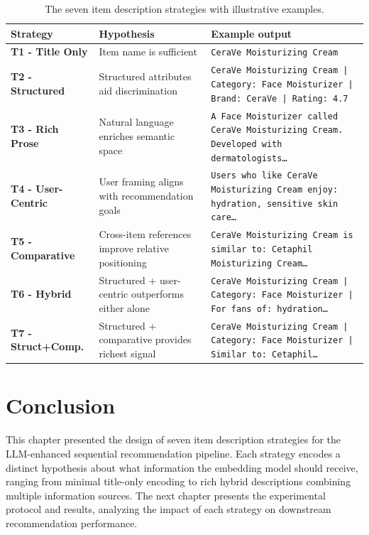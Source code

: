 \documentclass[12pt,a4paper]{report}
\begin{document}
\begin{table}[h]
\centering
\caption{The seven item description strategies with illustrative examples.}
\label{tab:prompt_strategies}
\begin{tabular}{p{2.2cm} p{3.5cm} p{7.0cm}}
\toprule
\textbf{Strategy} & \textbf{Hypothesis} & \textbf{Example output} \\
\midrule
\textbf{T1 - Title Only} & Item name is sufficient &
  \texttt{CeraVe Moisturizing Cream} \\
\midrule
\textbf{T2 - Structured} & Structured attributes aid discrimination &
  \texttt{CeraVe Moisturizing Cream | Category: Face Moisturizer | Brand: CeraVe | Rating: 4.7} \\
\midrule
\textbf{T3 - Rich Prose} & Natural language enriches semantic space &
  \texttt{A Face Moisturizer called CeraVe Moisturizing Cream. Developed with dermatologists\ldots} \\
\midrule
\textbf{T4 - User-Centric} & User framing aligns with recommendation goals &
  \texttt{Users who like CeraVe Moisturizing Cream enjoy: hydration, sensitive skin care\ldots} \\
\midrule
\textbf{T5 - Comparative} & Cross-item references improve relative positioning &
  \texttt{CeraVe Moisturizing Cream is similar to: Cetaphil Moisturizing Cream\ldots} \\
\midrule
\textbf{T6 - Hybrid} & Structured + user-centric outperforms either alone &
  \texttt{CeraVe Moisturizing Cream | Category: Face Moisturizer | For fans of: hydration\ldots} \\
\midrule
\textbf{T7 - Struct+Comp.} & Structured + comparative provides richest signal &
  \texttt{CeraVe Moisturizing Cream | Category: Face Moisturizer | Similar to: Cetaphil\ldots} \\
\bottomrule
\end{tabular}
\end{table}

\section{Conclusion}
\label{sec:ch4conclusion}

\justifying
This chapter presented the design of seven item description strategies for the
LLM-enhanced sequential recommendation pipeline. Each strategy encodes a
distinct hypothesis about what information the embedding model should receive,
ranging from minimal title-only encoding to rich hybrid descriptions combining
multiple information sources. The next chapter presents the experimental
protocol and results, analyzing the impact of each strategy on downstream
recommendation performance.
\end{document}
